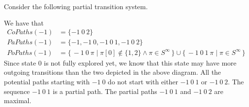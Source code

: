 \documentclass[12pt]{article}
\theoremstyle{definition}
\newenvironment{franck}{\color{red}}{\color{black}}
\begin{document}
Consider the following partial transition system.
\begin{center}
\end{center}
We have that
\begin{align*}
\mathit{CoPaths}(-1) & = \{ -1\ 0\ 2 \}\\
\mathit{PaPaths}(-1) & = \{ -1, -1\ 0, -1\ 0\ 1, -1\ 0\ 2 \}\\
\mathit{PoPaths}(-1) & = \{\, -1\ 0\ \pi \mid \pi[0] \not\in \{ 1, 2 \} \wedge \pi \in S^{\infty} \,\} \cup \{\, -1\ 0\ 1\ \pi \mid \pi \in S^{\infty} \,\}
\end{align*}
Since state 0 is not fully explored yet, we know that this state may have more outgoing transitions than the two depicted in the above diagram.  All the potential paths starting with $-1\ 0$ do not start with either $-1\ 0\ 1$ or $-1\ 0\ 2$.  The sequence $-1\ 0\ 1$ is a partial path.  \begin{franck}The partial paths $-1\ 0\ 1$ and $-1\ 0\ 2$ are maximal.\end{franck}
\end{document}
